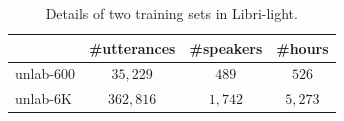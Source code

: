 \documentclass[transmag]{IEEEtran}
\begin{document}


\begin{table}[!t]
\renewcommand\arraystretch{0.5}
\centering
\caption{Details of two  training sets in Libri-light.}
\begin{tabular}{l|ccc}      
\toprule
& \#utterances & \#speakers & \#hours \\
\midrule
unlab-600 & $35,229$ & $489$ & $526$ \\
unlab-6K  & $362,816$  & $1,742$ & $5,273$ \\

\bottomrule
\end{tabular}%
\label{tab:exp_setup_libri_light_no_subsets}
\end{table}
\end{document}
